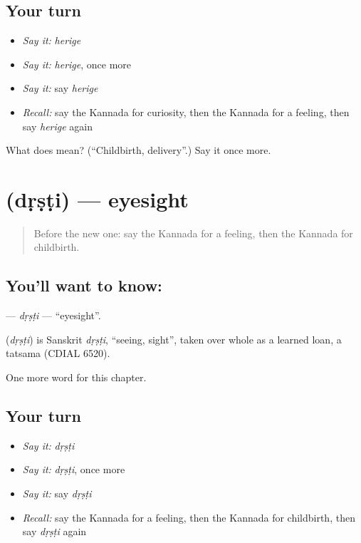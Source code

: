 \subsection*{Your turn}
\begin{itemize}
\raggedright
  \item \emph{Say it:} \emph{herige}
  \item \emph{Say it:} \emph{herige}, once more
  \item \emph{Say it:} say \emph{herige}
  \item \emph{Recall:} say the Kannada for curiosity, then the Kannada for a feeling, then say \emph{herige} again
\end{itemize}

\begin{tcolorbox}[breakable,colback=teal!4,colframe=teal!35!black,title={Before you move on}]
What does  mean? (\textquotedblleft{}Childbirth, delivery\textquotedblright{}.) Say it once more.
\end{tcolorbox}
\section[\texorpdfstring{\kn{ದೃಷ್ಟಿ} (dṛṣṭi)}{ದೃಷ್ಟಿ (dṛṣṭi)}]{ (dṛṣṭi) — eyesight}

\label{lesson:KA-C170-drsti}



\begin{quote}
Before the new one: say the Kannada for a feeling, then the Kannada for childbirth.
\end{quote}

\subsection*{You'll want to know: }
\textbf{} — \emph{dṛṣṭi} — \textquotedblleft{}eyesight\textquotedblright{}.

\begin{cousinweb}
\textbf{} (\emph{dṛṣṭi}) is Sanskrit \emph{dṛṣṭi}, \textquotedblleft{}seeing, sight\textquotedblright{}, taken over whole as a learned loan, a tatsama (CDIAL 6520).
\end{cousinweb}

\begin{grammarlens}[title={What you've built}]
One more word for this chapter.
\end{grammarlens}

\subsection*{Your turn}
\begin{itemize}
\raggedright
  \item \emph{Say it:} \emph{dṛṣṭi}
  \item \emph{Say it:} \emph{dṛṣṭi}, once more
  \item \emph{Say it:} say \emph{dṛṣṭi}
  \item \emph{Recall:} say the Kannada for a feeling, then the Kannada for childbirth, then say \emph{dṛṣṭi} again
\end{itemize}

